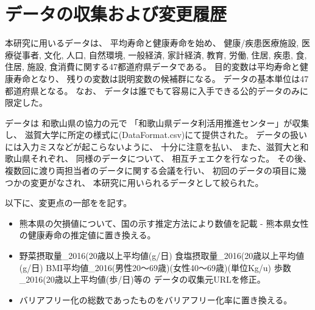\chapter{データの収集および変更履歴}


本研究に用いるデータは、
平均寿命と健康寿命を始め、
 健康/疾患医療施設, 医療従事者, 文化, 人口, 自然環境, 一般経済, 家計経済, 教育, 労働, 住居, 疾患, 食, 住居, 施設, 食消費に関する47都道府県データである。
目的変数は平均寿命と健康寿命となり、
残りの変数は説明変数の候補群になる。
データの基本単位は47都道府県となる。
なお、
データは誰でもて容易に入手できる公的データのみに限定した。


データは
和歌山県の協力の元で
「和歌山県データ利活用推進センター」が収集し、
滋賀大学に所定の様式に(DataFormat.csv)にて提供された。
データの扱いには入力ミスなどが起こらないように、
十分に注意を払い、
また、滋賀大と和歌山県それぞれ、
同様のデータについて、
相互チェエクを行なった。
その後、複数回に渡り両担当者のデータに関する会議を行い、
初回のデータの項目に幾つかの変更がなされ、
本研究に用いられるデータとして絞られた。

以下に、変更点の一部をを記す。
\begin{itemize}
	\item
		熊本県の欠損値について、国の示す推定方法により数値を記載 -
熊本県女性の健康寿命の推定値に置き換える。

\item
野菜摂取量\_2016(20歳以上平均値(g/日)
食塩摂取量\_2016(20歳以上平均値(g/日)
BMI平均値\_2016(男性20〜69歳)(女性40〜69歳)(単位Kg/u)
歩数\_2016(20歳以上平均値(歩/日)等の
データの収集元URLを修正。


%

\item

バリアフリー化の総数であったものをバリアフリー化率に置き換える。
%
%

\end{itemize}



